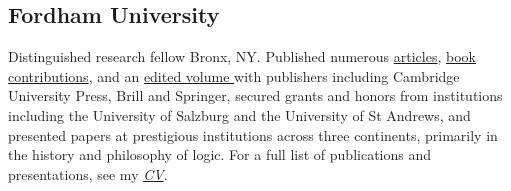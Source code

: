 \subsection{Fordham University}
{}
{Distinguished research fellow}
{Bronx, NY. Published numerous \href{https://fordham.academia.edu/jacobarchambault}{articles}, \href{https://www.collegepublications.co.uk/dialogues/?00005}{book} \href{https://www.cambridgescholars.com/hylomorphism-and-mereology}{contributions}, and an \href{https://brill.com/view/journals/viv/56/3-4/viv.56.issue-3-4.xml?language=en}{edited volume }
	with publishers including Cambridge University Press, Brill and Springer, 
	secured grants and honors from institutions including the University of Salzburg and the University of St Andrews,
	and presented papers at prestigious institutions across three continents, 
	primarily in the history and philosophy of logic. 
	For a full list of publications and presentations, see my 
	\href{https://github.com/JacobArchambault/Academic-Papers/blob/master/Professional\%20Documents/resume/cv.pdf}{\emph{CV}}.}
